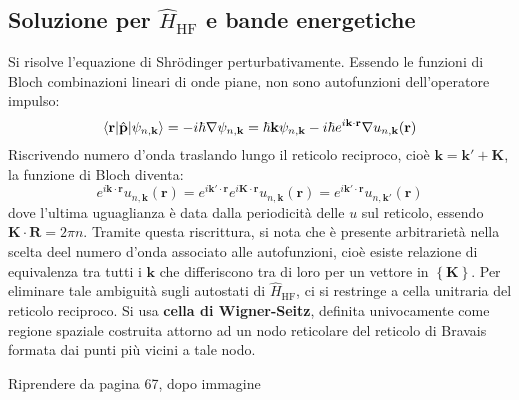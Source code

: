 \documentclass[10pt, a4paper]{scrartcl}
\numberwithin{equation}{subsection}
\theoremstyle{style1}
\newenvironment{boxenv}[1][]{
    \begin{eqbox}[#1]
    }{
   \end{eqbox}
}
\begin{document}
\subsection{Soluzione per $\hat{H}_\text{HF} $ e bande energetiche}
Si risolve l'equazione di Shr\"odinger perturbativamente. Essendo le funzioni di Bloch combinazioni lineari di onde piane, non sono autofunzioni dell'operatore impulso:
\[
\braket{\mathbf{r} |\hat{\mathbf{p} }|\psi _{n,\mathbf{k} } } =  - i \hbar  \nabla \psi _{n,\mathbf{k} } = \hbar \mathbf{k} \psi _{n,\mathbf{k} }  - i\hbar e^{i \mathbf{k} \cdot \mathbf{r} } \nabla u_{n,\mathbf{k} } (\mathbf{r} )
\] 
Riscrivendo numero d'onda traslando lungo il reticolo reciproco, cio\`e $\mathbf{k}  = \mathbf{k} ' + \mathbf{K} $, la funzione di Bloch diventa:
\[
e^{i \mathbf{k} \cdot \mathbf{r} } u_{n,\mathbf{k} } (\mathbf{r} ) = e^{i \mathbf{k} ' \cdot \mathbf{r} } e^{i \mathbf{K} \cdot \mathbf{r} } u_{n, \mathbf{k} } (\mathbf{r} )=  e^{i \mathbf{k} '\cdot \mathbf{r} } u_{n, \mathbf{k} '} (\mathbf{r} )
\] 
dove l'ultima uguaglianza \`e data dalla periodicit\`a delle $u$ sul reticolo, essendo $\mathbf{K}  \cdot \mathbf{R}  = 2\pi n$. Tramite questa riscrittura, si nota che \`e presente arbitrariet\`a nella scelta deel numero d'onda associato alle autofunzioni, cio\`e esiste relazione di equivalenza tra tutti i $\mathbf{k} $ che differiscono tra di loro per un vettore in $\left\{ \mathbf{K}  \right\} $. 
Per eliminare tale ambiguit\`a sugli autostati di $\hat{H}_\text{HF}$, ci si restringe a cella unitraria del reticolo reciproco. Si usa \textbf{cella di Wigner-Seitz}, definita univocamente come regione spaziale costruita attorno ad un nodo reticolare del reticolo di Bravais formata dai punti pi\`u vicini a tale nodo.
\begin{boxenv}[]
\centering Riprendere da pagina 67, dopo immagine
\end{boxenv}
\end{document}
